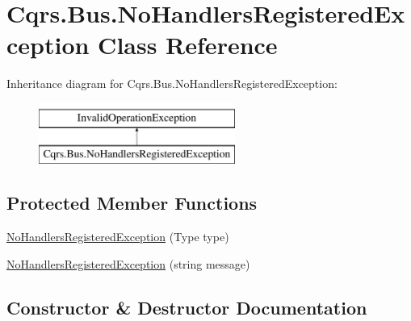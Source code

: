 \hypertarget{classCqrs_1_1Bus_1_1NoHandlersRegisteredException}{}\section{Cqrs.\+Bus.\+No\+Handlers\+Registered\+Exception Class Reference}
\label{classCqrs_1_1Bus_1_1NoHandlersRegisteredException}
Inheritance diagram for Cqrs.\+Bus.\+No\+Handlers\+Registered\+Exception\+:\begin{figure}[H]
\begin{center}
\leavevmode
\includegraphics[height=2.000000cm]{classCqrs_1_1Bus_1_1NoHandlersRegisteredException}
\end{center}
\end{figure}
\subsection*{Protected Member Functions}
\begin{DoxyCompactItemize}
\item 
\hyperlink{classCqrs_1_1Bus_1_1NoHandlersRegisteredException_ae0a819bb83ab2518e5abbfd2a67376ad_ae0a819bb83ab2518e5abbfd2a67376ad}{No\+Handlers\+Registered\+Exception} (Type type)
\item 
\hyperlink{classCqrs_1_1Bus_1_1NoHandlersRegisteredException_a7625d1c076a9d942025d1530729f7571_a7625d1c076a9d942025d1530729f7571}{No\+Handlers\+Registered\+Exception} (string message)
\end{DoxyCompactItemize}


\subsection{Constructor \& Destructor Documentation}
\mbox{\label{classCqrs_1_1Bus_1_1NoHandlersRegisteredException_ae0a819bb83ab2518e5abbfd2a67376ad_ae0a819bb83ab2518e5abbfd2a67376ad}} 
